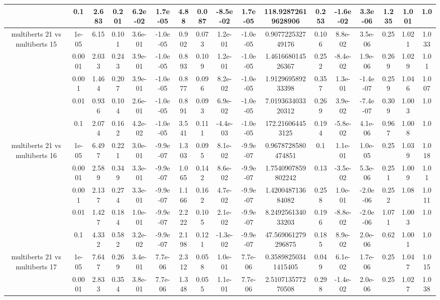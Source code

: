 \begin{tabular}{|c|c|c|c|c|c|c|c|c|c|c|c|c|c|c|c|c|}
 & 0.1 & 2.683 & 0.201 & 6.2e-02 & 1.7e-05 & 4.88 & 0.087 & -8.5e-02 & 1.7e-05 & 118.92872619628906 & 0.253 & -1.6e-02 & 3.3e-06 & 1.235 & 1.001 & 1.0 \\
\hline
\multirow{5}{*}{multiberts 21 vs multiberts 15} & 1e-05 & 6.15 & 0.101 & 3.6e-01 & -1.0e-05 & 0.902 & 0.073 & 1.2e-01 & -1.0e-05 & 0.907722532749176 & 0.106 & 8.8e-02 & 3.5e-06 & 0.25 & 1.021 & 1.033 \\
 & 0.0001 & 2.033 & 0.243 & 3.9e-01 & -1.0e-05 & 0.893 & 0.109 & 1.2e-01 & -1.0e-05 & 1.461668014526367 & 0.252 & -8.4e-02 & 1.9e-06 & 0.269 & 1.029 & 1.01 \\
 & 0.001 & 1.464 & 0.207 & 3.9e-01 & -1.0e-05 & 0.877 & 0.096 & 8.2e-02 & -1.0e-05 & 1.912969589233398 & 0.357 & 1.3e-01 & -1.4e-07 & 0.259 & 1.046 & 1.007 \\
 & 0.01 & 0.936 & 0.104 & 2.6e-01 & -1.0e-05 & 0.891 & 0.093 & 6.9e-02 & -1.0e-05 & 7.019363403320312 & 0.269 & 3.9e-02 & -7.4e-07 & 0.309 & 1.003 & 1.0 \\
 & 0.1 & 2.074 & 0.162 & 4.2e-02 & -1.0e-05 & 3.541 & 0.111 & -4.4e-03 & -1.0e-05 & 172.216064453125 & 0.194 & -5.8e-02 & 4.1e-06 & 0.967 & 1.008 & 1.0 \\
\hline
\multirow{5}{*}{multiberts 21 vs multiberts 16} & 1e-05 & 6.497 & 0.221 & 3.0e-01 & -9.9e-07 & 1.303 & 0.095 & 8.1e-02 & -9.9e-07 & 0.9678728580474851 & 0.1 & 1.1e-01 & 1.0e-05 & 0.25 & 1.039 & 1.018 \\
 & 0.0001 & 2.589 & 0.349 & 3.3e-01 & -9.9e-07 & 1.065 & 0.142 & 8.6e-02 & -9.9e-07 & 1.7540907859802242 & 0.13 & -3.5e-02 & 5.3e-06 & 0.251 & 1.009 & 1.01 \\
 & 0.001 & 2.137 & 0.274 & 3.3e-01 & -9.9e-07 & 1.166 & 0.162 & 4.7e-02 & -9.9e-07 & 1.420048713684082 & 0.258 & 1.0e-01 & -2.0e-06 & 0.252 & 1.08 & 1.011 \\
 & 0.01 & 1.427 & 0.184 & 1.0e-01 & -9.9e-07 & 2.222 & 0.105 & 2.1e-02 & -9.9e-07 & 8.249256134033203 & 0.196 & -8.8e-02 & -2.0e-06 & 1.071 & 1.003 & 1.0 \\
 & 0.1 & 4.332 & 0.582 & 3.2e-02 & -9.9e-07 & 2.198 & 0.121 & -1.3e-02 & -9.9e-07 & 47.569061279296875 & 0.185 & 8.9e-02 & 2.0e-06 & 0.62 & 1.001 & 1.0 \\
\hline
\multirow{5}{*}{multiberts 21 vs multiberts 17} & 1e-05 & 7.647 & 0.269 & 3.4e-01 & 7.7e-06 & 2.312 & 0.058 & 1.0e-01 & 7.7e-06 & 0.35898250341415405 & 0.049 & 6.1e-02 & 1.7e-06 & 0.25 & 1.047 & 1.015 \\
 & 0.0001 & 2.833 & 0.354 & 3.8e-01 & 7.7e-06 & 1.348 & 0.055 & 1.1e-01 & 7.7e-06 & 2.510713577270508 & 0.298 & -1.4e-02 & 2.0e-06 & 0.25 & 1.027 & 1.038 \\

\end{tabular}
